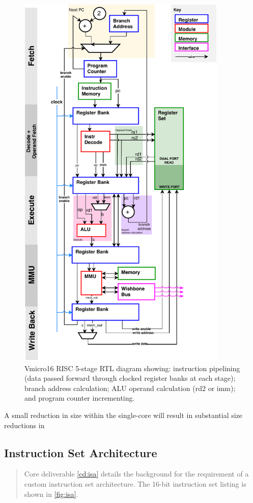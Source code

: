 \begin{figure}[H]
\centering 
\includegraphics[width=10cm]{../img/risc}
\caption{Vmicro16 RISC 5-stage RTL diagram showing: instruction pipelining (data passed forward through clocked register banks at each stage); branch address calculation; ALU operand calculation (rd2 or imm); and program counter incrementing.}
\label{fig:risc}
\end{figure}

A small reduction in size within the single-core will result in substantial size reductions in 

\subsection{Instruction Set Architecture}
\begin{quotation}
\noindent Core deliverable \ref{cd:isa} details the background for the requirement of a custom instruction set architecture. 
The 16-bit instruction set listing is shown in \cref{fig:isa}.
\end{quotation}


